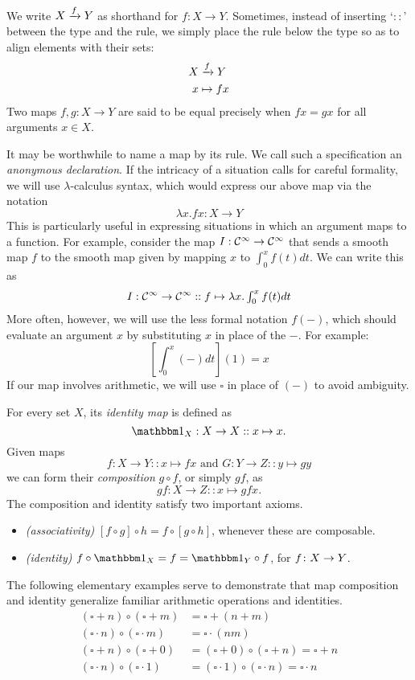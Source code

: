 We write $X\xrightarrow{f}Y$ as shorthand for $f:X\to Y$. Sometimes, instead of inserting `$::$' between the type and the rule, we simply place the rule below the type so as to align elements with their sets:
\begin{align*}
    X&\xrightarrow{f} Y \\
    x&\mapsto fx
\end{align*}
Two maps $f,g:X\to Y$ are said to be equal precisely when $fx=gx$ for all arguments $x\in X$.

It may be worthwhile to name a map by its rule. We call such a specification an \emph{anonymous declaration}. If the intricacy of a situation calls for careful formality, we will use $\lambda$-calculus syntax, which would express our above map via the notation \[\lambda x.fx : X\to Y\]
This is particularly useful in expressing situations in which an argument maps to a function. For example, consider the map $I:\mathcal{C}^\infty\to\mathcal{C}^\infty$ that sends a smooth map $f$ to the smooth map given by mapping $x$ to $\int_0^x f(t) dt$. We can write this as
\begin{equation} \label{eqn:integral}
    I:\mathcal{C}^\infty\to\mathcal{C}^\infty::f\mapsto \lambda x.\textstyle\int_0^xf(t)dt
\end{equation}
More often, however, we will use the less formal notation $f(-)$, which should evaluate an argument $x$ by substituting $x$ in place of the $-$. For example: 
\[[\textstyle\int_0^x(-)dt](1)= x\]
If our map involves arithmetic, we will use $\square$ in place of $(-)$ to avoid ambiguity.

For every set $X$, its \emph{identity map} is defined as \[\Id{X}:X\to X::x\mapsto x.\] 
Given maps 
\[f:X\to Y::x\mapsto fx \text{ and } G:Y\to Z::y\mapsto gy\] we can form their \emph{composition} $g\circ f$, or simply $gf$, as \[g f:X\to Z::x\mapsto gfx.\]
The composition and identity satisfy two important axioms.

\begin{itemize}
    \item \emph{(associativity)} $[f\circ g]\circ h=f\circ[g\circ h]$, whenever these are composable.
    \item \emph{(identity)} $f\circ\Id{X}=f=\Id{Y}\circ f$, for $f\colon X\to Y$.
\end{itemize}

The following elementary examples serve to demonstrate that map composition and identity generalize familiar arithmetic operations and identities.
\begin{align*}
    (\square+n)\circ (\square+m) &=\square + (n+m) \\
    (\square\cdot n)\circ (\square\cdot m) &=\square \cdot (nm) \\
    (\square+n)\circ (\square+0) &= (\square +0)\circ(\square+n)=\square+n\\
    (\square\cdot n)\circ (\square\cdot 1) &= (\square \cdot 1)\circ (\square\cdot n)=\square\cdot n
\end{align*}

